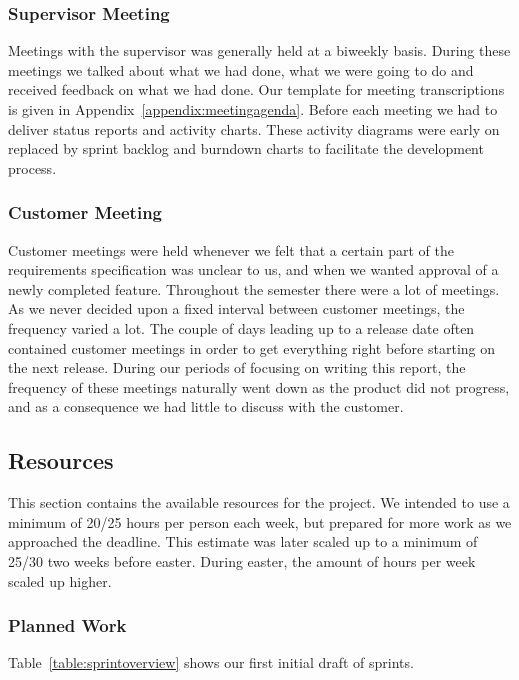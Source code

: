 \subsubsection{Supervisor Meeting}
Meetings with the supervisor was generally held at a biweekly basis.
During these meetings we talked about what we had done, what we were
going to do and received feedback on what we had done. Our template
for meeting transcriptions is given in Appendix~\ref{appendix:meetingagenda}.
Before each
meeting we had to deliver status reports and activity charts. These
activity diagrams were early on replaced by sprint backlog and burndown
charts to facilitate the development process. 

\subsubsection{Customer Meeting}
Customer meetings were held whenever we felt that a certain part of the
requirements specification was unclear to us, and when we wanted approval of a
newly completed feature. Throughout the semester there were a lot of meetings.
As we never decided upon a fixed interval between customer meetings, the
frequency varied a lot. The couple of days leading up to a release date often
contained customer meetings in order to get everything right before starting on
the next release. During our periods of focusing on writing this report, the
frequency of these meetings naturally went down as the product did not
progress, and as a consequence we had little to discuss with the customer. 

\subsection{Resources}
This section contains the available resources for the project. We
intended to use a minimum of 20/25 hours per person each week, but
prepared for more work as we approached the deadline. This estimate was
later scaled up to a minimum of 25/30 two weeks before easter. During
easter, the amount of hours per week scaled up higher. 

\subsubsection{Planned Work}
Table~\ref{table:sprintoverview} shows our first initial draft of sprints. 

